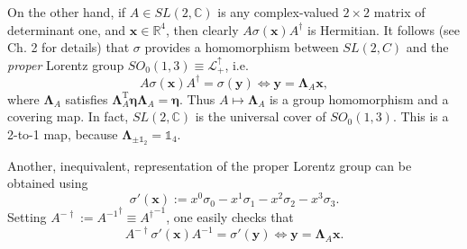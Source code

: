 \documentclass[12pt]{article}
\theoremstyle{definition}
\numberwithin{equation}{section}
\newcommand{\bx}{\mathbf{x}}
\newcommand{\by}{\mathbf{y}}
\newcommand{\beq}{\begin{equation}}
\newcommand{\eeq}{\end{equation}}
\newcommand{\Id}{\mathds{1}}
\newcommand{\bLa}{\boldsymbol{\Lambda}}
\newcommand{\Cset}{{\mathbb C}}
\newcommand{\Rset}{{\mathbb R}}
\newcommand{\si}{\sigma}
\begin{document}
  On the other hand, if $A \in SL(2,\Cset)$ is any complex-valued $2\times 2$ matrix of determinant one, and $\bx \in \Rset^4$, then
 clearly $A\si(\bx)A^\dagger$ is Hermitian.
 It follows (see \cite{ThallerBOOK} Ch. 2 for details) that $\si$ provides a homomorphism between $SL(2,C)$ and the {\em proper} 
Lorentz group  $SO_0(1,3)\equiv\mathcal{L}^\uparrow_+$, i.e.
\beq \label{six}
A \si(\bx) A^\dagger = \si(\by) \iff \by = \bLa_A \bx,
\eeq
where $\bLa_A$ satisfies $\bLa_A^{\mathrm{T}} \boldsymbol{\eta} \bLa_A = \boldsymbol{\eta}$. 
 Thus $A \mapsto \bLa_A$ is a group homomorphism and a covering map.
 In fact,  $SL(2,\Cset)$ is the universal cover of $SO_0(1,3)$.
 This is a 2-to-1 map, because $\bLa_{\pm \Id_2 }= \Id_4$.


 Another, inequivalent, representation of the proper Lorentz group can be obtained using 
\beq \label{def:sipx}
\si'(\bx) := x^0 \si_0 - x^1\si_1 - x^2\si_2 - x^3 \si_3.
\eeq
 Setting $A^{-\dag} := {A^{-1}}^\dag \equiv {A^\dag}^{-1}$, one easily checks that 
\beq \label{siprx}
A^{-\dag} \si'(\bx) A^{-1} = \si'(\by) \iff \by = \bLa_A \bx.
\eeq
\end{document}
